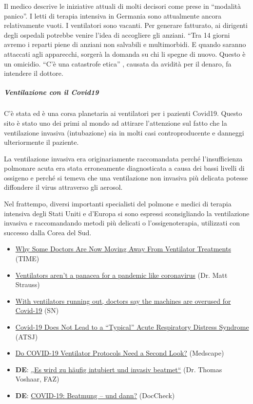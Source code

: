 Il medico descrive le iniziative attuali di molti decisori come prese in
``modalità panico''. I letti di terapia intensiva in Germania sono
attualmente ancora relativamente vuoti. I ventilatori sono vacanti. Per
generare fatturato, ai dirigenti degli ospedali potrebbe venire l'idea
di accogliere gli anziani. ``Tra 14 giorni avremo i reparti piene di
anziani non salvabili e multimorbidi. E quando saranno attaccati agli
apparecchi, sorgerà la domanda su chi li spegne di nuovo. Questo è un
omicidio. ``C'è una catastrofe etica'' , causata da avidità per il
denaro, fa intendere il dottore.\\

\hypertarget{ventilazione-con-il-covid19-1}{%
\subparagraph{\texorpdfstring{\textbf{Ventilazione con il
Covid19}}{Ventilazione con il Covid19}}\label{ventilazione-con-il-covid19-1}}

C'è stata ed è una corsa planetaria ai ventilatori per i pazienti
Covid19. Questo sito è stato uno dei primi al mondo ad attirare
l'attenzione sul fatto che la ventilazione invasiva (intubazione) sia in
molti casi controproducente e danneggi ulteriormente il paziente.

La ventilazione invasiva era originariamente raccomandata perché
l'insufficienza polmonare acuta era stata erroneamente diagnosticata a
causa dei bassi livelli di ossigeno e perché si temeva che una
ventilazione non invasiva più delicata potesse diffondere il virus
attraverso gli aerosol.

Nel frattempo, diversi importanti specialisti del polmone e medici di
terapia intensiva degli Stati Uniti e d'Europa si sono espressi
sconsigliando la ventilazione invasiva e raccomandando metodi più
delicati o l'ossigenoterapia, utilizzati con successo dalla Corea del
Sud.

\begin{itemize}
\tightlist
\item
  \href{https://time.com/5818547/ventilators-coronavirus/}{Why Some
  Doctors Are Now Moving Away From Ventilator Treatments} (TIME)
\item
  \href{https://www.spectator.co.uk/article/Ventilators-aren-t-a-panacea-for-a-pandemic-like-coronavirus}{Ventilators
  aren't a panacea for a pandemic like coronavirus} (Dr. Matt Strauss)
\item
  \href{https://www.statnews.com/2020/04/08/doctors-say-ventilators-overused-for-covid-19/}{With
  ventilators running out, doctors say the machines are overused for
  Covid-19} (SN)
\item
  \href{https://www.atsjournals.org/doi/pdf/10.1164/rccm.202003-0817LE}{Covid-19
  Does Not Lead to a ``Typical'' Acute Respiratory Distress Syndrome}
  (ATSJ)
\item
  \href{https://www.medscape.com/viewarticle/928156}{Do COVID-19
  Ventilator Protocols Need a Second Look?} (Medscape)
\item
  \textbf{DE}: \href{https://archive.is/KX5IQ}{„Es wird zu häufig
  intubiert und invasiv beatmet``} (Dr. Thomas Voshaar, FAZ)
\item
  \textbf{DE}:
  \href{https://www.doccheck.com/de/detail/articles/26271-covid-19-beatmung-und-dann}{COVID-19:
  Beatmung -- und dann?} (DocCheck)
\end{itemize}

